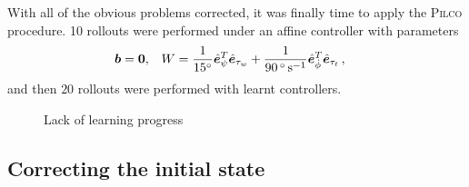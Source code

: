 \documentclass[main.tex]{subfiles}
\begin{document}

	With all of the obvious problems corrected, it was finally time to apply the \textsc{Pilco} procedure.
	10 rollouts were performed under an affine controller with parameters
	\begin{align}
		\bm{b} &= \bm{0}, &
		W &=
			\frac{1}{\SI{15}{\degree}}
			\hat{\bm{e}}_{\psi}^T\hat{\bm{e}}_{\tau_w}
			+ \frac{1}{\SI{90}{\degree\per\second}}
			\hat{\bm{e}}_{\dot\phi}^T\hat{\bm{e}}_{\tau_t}\,,
	\end{align}
	and then $20$ rollouts were performed with learnt controllers.
	\begin{figure}
		
		\caption{Lack of learning progress}
	\end{figure}

	\subsection{Correcting the initial state}


\bib
\end{document}
